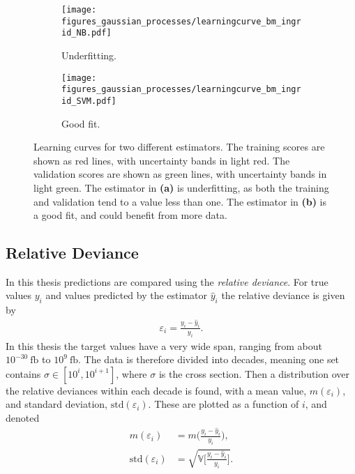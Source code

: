 \documentclass[twoside,english]{uiofysmaster}
\begin{document}
{{\begin{figure}
    \centering
    \begin{subfigure}[b]{0.45\textwidth}
        \texttt{[image: figures\_gaussian\_processes/learningcurve\_bm\_ingrid\_NB.pdf]}
        \caption{Underfitting.}
        \label{fig:gull}
    \end{subfigure}
    \begin{subfigure}[b]{0.45\textwidth}
        \texttt{[image: figures\_gaussian\_processes/learningcurve\_bm\_ingrid\_SVM.pdf]}
        \caption{Good fit.}
        \label{fig:tiger}
    \end{subfigure}
\caption[Learning curve examples]{Learning curves for two different estimators. The training scores are shown as red lines, with uncertainty bands in light red. The validation scores are shown as green lines, with uncertainty bands in light green. The estimator in \textbf{(a)} is underfitting, as both the training and validation tend to a value less than one. The estimator in \textbf{(b)} is a good fit, and could benefit from more data.}
\label{Fig:: gaussian process : learning curves}
\end{figure}



\subsection{Relative Deviance}\label{Sec:: gaussian process : Relative Deviance}

In this thesis predictions are compared using the \textit{relative deviance}. For true values $y_i$ and values predicted by the estimator $\hat{y}_i$ the relative deviance is given by
\begin{align}\label{Eq:: gaussian process : Relative deviance}
\varepsilon_i = \frac{y_i - \hat{y}_i}{y_i}.
\end{align} 
In this thesis the target values have a very wide span, ranging from about $10^{-30}~\mathrm{fb}$ to $10^9~\mathrm{fb}$. The data is therefore divided into decades, meaning one set contains $\sigma \in [10^i, 10^{i+1}]$, where $\sigma$ is the cross section. Then a distribution over the relative deviances within each decade is found, with a mean value, $m(\varepsilon_i)$, and standard deviation, $\mathrm{std}(\varepsilon_i)$. These are plotted as a function of $i$, and denoted
\begin{align}
m(\varepsilon_i) &= m \Big(\frac{y_i - \hat{y}_i}{y_i}\Big),\label{Eq:: gaussian process : rel deviance mean} \\
\mathrm{std} (\varepsilon_i) &= \sqrt{ \mathbb{V} \Big[\frac{y_i - \hat{y}_i}{y_i}\Big] }\label{Eq:: gaussian process : rel deviance variance}.
\end{align} 




}}
\end{document}
